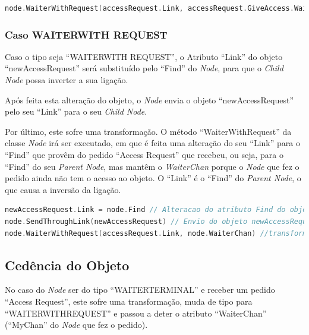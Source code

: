 \begin{lstlisting}[caption={Comportamento do \emph{Node} tipo \emph{Owner Terminal} caso receba um pedido \emph{Access Request} no \emph{Channel ``Find''}},language=Go]
node.WaiterWithRequest(accessRequest.Link, accessRequest.GiveAccess.WaiterChan)
\end{lstlisting}


\subsubsection*{Caso WAITER\textunderscore WITH \textunderscore REQUEST}	
Caso o tipo seja ``WAITER\textunderscore WITH \textunderscore REQUEST'', o Atributo ``Link'' do objeto ``newAccessRequest'' será substituído pelo ``Find'' do \emph{Node},
para que o \emph{Child Node} possa inverter a sua ligação.

Após feita esta alteração do objeto, o \emph{Node} envia o objeto ``newAccessRequest'' pelo seu ``Link'' para o seu \emph{Child Node}.

Por último, este sofre uma transformação. O método ``WaiterWithRequest'' da classe \emph{Node} irá ser executado, 
em que é feita uma alteração do seu ``Link'' para o ``Find'' que provêm do pedido ``Access Request'' que recebeu, ou seja, para o ``Find'' do seu \emph{Parent Node}, 
mas mantêm o \emph{WaiterChan} porque o \emph{Node} que fez o pedido ainda não tem o acesso ao objeto.
O ``Link'' é o ``Find'' do \emph{Parent Node}, o que causa a inversão da ligação.

\begin{lstlisting}[caption={Comportamento do \emph{Node} tipo \emph{Owner Terminal} caso receba um pedido \emph{Access Request} no \emph{Channel ``Find''}},language=Go]
newAccessRequest.Link = node.Find // Alteracao do atributo Find do objeto newAccessRequest para o Find do Node
node.SendThroughLink(newAccessRequest) // Envio do objeto newAccessRequest pelo link
node.WaiterWithRequest(accessRequest.Link, node.WaiterChan) //transformacao do Node. Mantem-se o WaiterChan mas altera-se o Link
\end{lstlisting}

\subsection{Cedência do Objeto}
No caso do \emph{Node} ser do tipo ``WAITER\textunderscore TERMINAL'' e receber um pedido ``Access Request'', 
este sofre uma transformação, muda de tipo para ``WAITER\textunderscore WITH\textunderscore REQUEST'' e passou a deter o atributo ``WaiterChan'' (``MyChan'' do \emph{Node} que fez o pedido).

